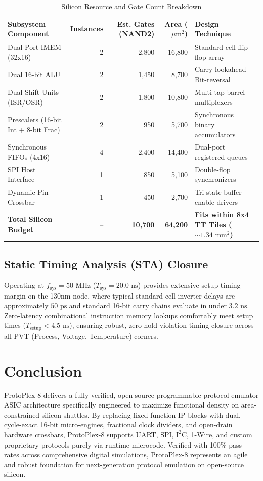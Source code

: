 \documentclass[11pt,a4paper]{article}
\begin{document}
\begin{table}[htbp]
\centering
\caption{Silicon Resource and Gate Count Breakdown}
\label{tab:area_budget}
\begin{tabularx}{\textwidth}{lrrrX}
\toprule
\textbf{Subsystem Component} & \textbf{Instances} & \textbf{Est. Gates (NAND2)} & \textbf{Area ($\mu\text{m}^2$)} & \textbf{Design Technique} \\
\midrule
Dual-Port IMEM (32x16) & 2 & 2,800 & 16,800 & Standard cell flip-flop array \\
Dual 16-bit ALU & 2 & 1,450 & 8,700 & Carry-lookahead + Bit-reversal \\
Dual Shift Units (ISR/OSR) & 2 & 1,800 & 10,800 & Multi-tap barrel multiplexers \\
Prescalers (16-bit Int + 8-bit Frac) & 2 & 950 & 5,700 & Synchronous binary accumulators \\
Synchronous FIFOs (4x16) & 4 & 2,400 & 14,400 & Dual-port registered queues \\
SPI Host Interface & 1 & 850 & 5,100 & Double-flop synchronizers \\
Dynamic Pin Crossbar & 1 & 450 & 2,700 & Tri-state buffer enable drivers \\
\midrule
\textbf{Total Silicon Budget} & -- & \textbf{10,700} & \textbf{64,200} & \textbf{Fits within 8x4 TT Tiles ($\sim 1.34\text{ mm}^2$)} \\
\bottomrule
\end{tabularx}
\end{table}

\subsection{Static Timing Analysis (STA) Closure}
Operating at $f_{\text{sys}} = 50\text{ MHz}$ ($T_{\text{sys}} = 20.0\text{ ns}$) provides extensive setup timing margin on the 130nm node, where typical standard cell inverter delays are approximately $50\text{ ps}$ and standard 16-bit carry chains evaluate in under $3.2\text{ ns}$. Zero-latency combinational instruction memory lookups comfortably meet setup times ($T_{\text{setup}} < 4.5\text{ ns}$), ensuring robust, zero-hold-violation timing closure across all PVT (Process, Voltage, Temperature) corners.

\section{Conclusion}
ProtoPlex-8 delivers a fully verified, open-source programmable protocol emulator ASIC architecture specifically engineered to maximize functional density on area-constrained silicon shuttles. By replacing fixed-function IP blocks with dual, cycle-exact 16-bit micro-engines, fractional clock dividers, and open-drain hardware crossbars, ProtoPlex-8 supports UART, SPI, $\text{I}^2\text{C}$, 1-Wire, and custom proprietary protocols purely via runtime microcode. Verified with 100\% pass rates across comprehensive digital simulations, ProtoPlex-8 represents an agile and robust foundation for next-generation protocol emulation on open-source silicon.
\end{document}
